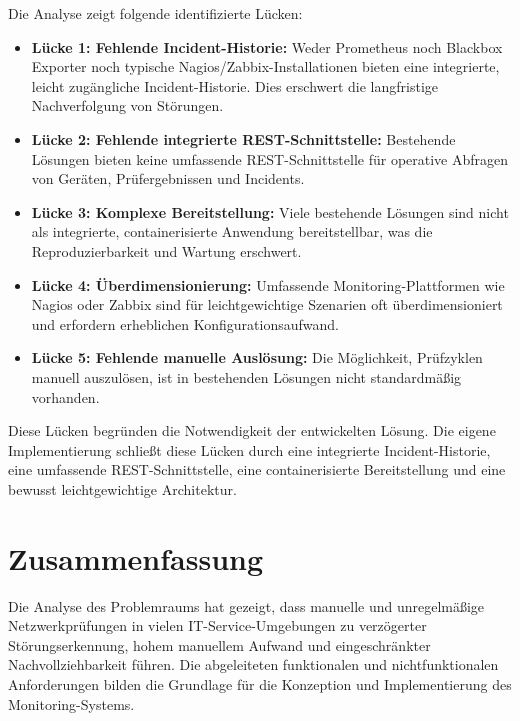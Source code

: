 Die Analyse zeigt folgende identifizierte Lücken:

\begin{itemize}
    \item \textbf{Lücke 1: Fehlende Incident-Historie:} Weder Prometheus noch Blackbox Exporter noch typische Nagios/Zabbix-Installationen bieten eine integrierte, leicht zugängliche Incident-Historie. Dies erschwert die langfristige Nachverfolgung von Störungen.
    
    \item \textbf{Lücke 2: Fehlende integrierte REST-Schnittstelle:} Bestehende Lösungen bieten keine umfassende REST-Schnittstelle für operative Abfragen von Geräten, Prüfergebnissen und Incidents.
    
    \item \textbf{Lücke 3: Komplexe Bereitstellung:} Viele bestehende Lösungen sind nicht als integrierte, containerisierte Anwendung bereitstellbar, was die Reproduzierbarkeit und Wartung erschwert.
    
    \item \textbf{Lücke 4: Überdimensionierung:} Umfassende Monitoring-Plattformen wie Nagios oder Zabbix sind für leichtgewichtige Szenarien oft überdimensioniert und erfordern erheblichen Konfigurationsaufwand.
    
    \item \textbf{Lücke 5: Fehlende manuelle Auslösung:} Die Möglichkeit, Prüfzyklen manuell auszulösen, ist in bestehenden Lösungen nicht standardmäßig vorhanden.
\end{itemize}

Diese Lücken begründen die Notwendigkeit der entwickelten Lösung. Die eigene Implementierung schließt diese Lücken durch eine integrierte Incident-Historie, eine umfassende REST-Schnittstelle, eine containerisierte Bereitstellung und eine bewusst leichtgewichtige Architektur.

\section{Zusammenfassung}
\label{sec:zusammenfassung-analyse}

Die Analyse des Problemraums hat gezeigt, dass manuelle und unregelmäßige Netzwerkprüfungen in vielen IT-Service-Umgebungen zu verzögerter Störungserkennung, hohem manuellem Aufwand und eingeschränkter Nachvollziehbarkeit führen. Die abgeleiteten funktionalen und nichtfunktionalen Anforderungen bilden die Grundlage für die Konzeption und Implementierung des Monitoring-Systems.


